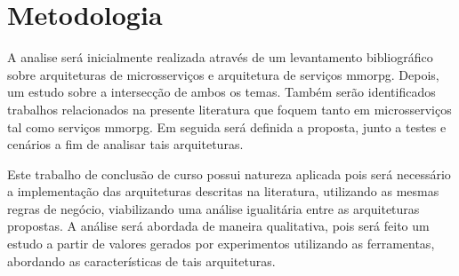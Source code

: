 


\section{Metodologia}



A analise será inicialmente realizada através de um levantamento bibliográfico sobre arquiteturas de microsserviços e arquitetura de serviços \ac{mmorpg}.
%
Depois, um estudo sobre a intersecção de ambos os temas.
%
Também serão identificados trabalhos relacionados na presente literatura que foquem tanto em microsserviços tal como serviços \ac{mmorpg}.
%
Em seguida será definida a proposta, junto a testes e cenários a fim de analisar tais arquiteturas.



Este trabalho de conclusão de curso possui natureza aplicada pois será necessário a implementação das arquiteturas descritas na literatura, utilizando as mesmas regras de negócio, viabilizando uma análise igualitária entre as arquiteturas propostas.
%
A análise será abordada de maneira qualitativa, pois será feito um estudo a partir de valores gerados por experimentos utilizando as ferramentas, abordando as características de tais arquiteturas.

